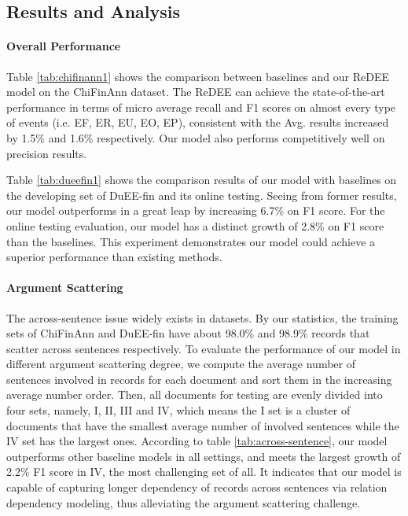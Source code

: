 \documentclass[11pt]{article}
\begin{document}
\subsection{Results and Analysis}

\paragraph{Overall Performance} Table \ref{tab:chifinann1} shows the comparison between baselines and our ReDEE model on the ChiFinAnn dataset. The ReDEE can achieve the state-of-the-art performance in terms of micro average recall and F1 scores on almost every type of events (i.e. EF, ER, EU, EO, EP), consistent with the Avg. results increased by 1.5\% and 1.6\% respectively. Our model also performs competitively well on precision results.

Table \ref{tab:dueefin1} shows the comparison results of our model with baselines on the developing set of DuEE-fin and its online testing. Seeing from former results, our model outperforms in a great leap by increasing 6.7\% on F1 score. For the online testing evaluation, our model has a distinct growth of 2.8\% on F1 score than the baselines. This experiment demonstrates our model could achieve a superior performance than existing methods.

\paragraph{Argument Scattering} The across-sentence issue widely exists in datasets. By our statistics, the training sets of ChiFinAnn and DuEE-fin have about 98.0\% and 98.9\% records that scatter across sentences respectively. To evaluate the performance of our model in different argument scattering degree, we compute the average number of sentences involved in records for each document and sort them in the increasing average number order. Then, all documents for testing are evenly divided into four sets, namely, I, II, III and IV, which means the I set is a cluster of documents that have the smallest average number of involved sentences while the IV set has the largest ones. According to table \ref{tab:across-sentence}, our model outperforms other baseline models in all settings, and meets the largest growth of 2.2\% F1 score in IV, the most challenging set of all. It indicates that our model is capable of capturing longer dependency of records across sentences via relation dependency modeling, thus alleviating the argument scattering challenge.
\end{document}
